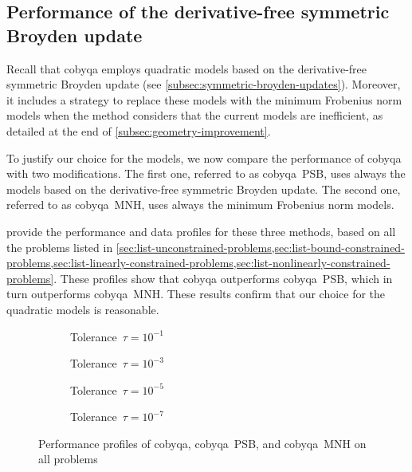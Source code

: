 \subsection{Performance of the derivative-free symmetric Broyden update}
\label{subsec:alternative-models}

Recall that \gls{cobyqa} employs quadratic models based on the derivative-free symmetric Broyden update (see \cref{subsec:symmetric-broyden-updates}).
Moreover, it includes a strategy to replace these models with the minimum Frobenius norm models when the method considers that the current models are inefficient, as detailed at the end of \cref{subsec:geometry-improvement}.

To justify our choice for the models, we now compare the performance of \gls{cobyqa} with two modifications.
The first one, referred to as \gls{cobyqa}~PSB, uses always the models based on the derivative-free symmetric Broyden update.
The second one, referred to as \gls{cobyqa}~MNH, uses always the minimum Frobenius norm models.

 provide the performance and data profiles for these three methods, based on all the problems listed in \cref{sec:list-unconstrained-problems,sec:list-bound-constrained-problems,sec:list-linearly-constrained-problems,sec:list-nonlinearly-constrained-problems}.
These profiles show that \gls{cobyqa} outperforms \gls{cobyqa}~PSB, which in turn outperforms \gls{cobyqa}~MNH.
These results confirm that our choice for the quadratic models is reasonable.

\begin{figure}[ht]
    \centering
    \begin{subfigure}[b]{0.49\textwidth}
        \centering
        \caption{Tolerance~$\tau = 10^{-1}$}
    \end{subfigure}
    \hfill
    \begin{subfigure}[b]{0.49\textwidth}
        \centering
        \caption{Tolerance~$\tau = 10^{-3}$}
    \end{subfigure}
    \begin{subfigure}[b]{0.49\textwidth}
        \centering
        \caption{Tolerance~$\tau = 10^{-5}$}
    \end{subfigure}
    \hfill
    \begin{subfigure}[b]{0.49\textwidth}
        \centering
        \caption{Tolerance~$\tau = 10^{-7}$}
    \end{subfigure}
    \caption[Performance profiles with different models]{Performance profiles of \gls{cobyqa}, \gls{cobyqa}~PSB, and \gls{cobyqa}~MNH on all problems}
    \label{fig:perf-models}
\end{figure}

